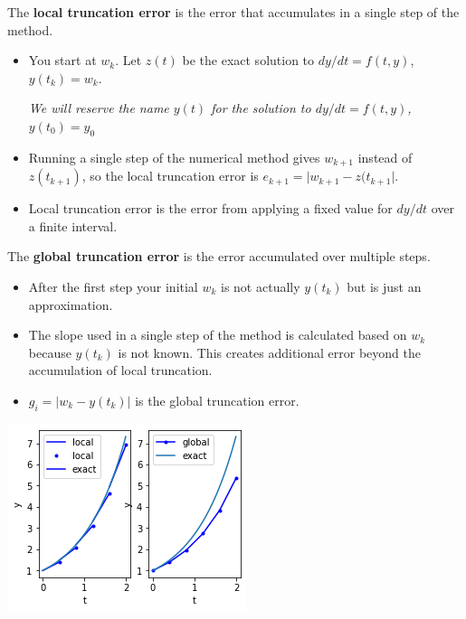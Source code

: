 \documentclass[12pt,letterpaper,noanswers]{exam}
\begin{document}
\begin{tcolorbox}
The \textbf{local truncation error} is the error that accumulates in a single step of the method.
\begin{itemize}
\itemsep0pt
    \item You start at $w_k$.  Let $z(t)$ be the exact solution to $dy/dt = f(t,y)$, $y(t_k) = w_k$.
    
    \emph{We will reserve the name $y(t)$ for the solution to $dy/dt = f(t,y)$, $y(t_0) = y_0$}
    \item Running a single step of the numerical method gives $w_{k+1}$ instead of $z(t_{k+1})$, so the local truncation error is $e_{k+1} = \vert w_{k+1} - z(t_{k+1}\vert$.
    \item Local truncation error is the error from applying a fixed value for $dy/dt$ over a finite interval.
\end{itemize}
The \textbf{global truncation error} is the error accumulated over multiple steps.
\begin{itemize}
\itemsep0pt
    \item After the first step your initial $w_k$ is not actually $y(t_k)$ but is just an approximation.
    \item The slope used in a single step of the method is calculated based on $w_k$ because $y(t_k)$ is not known.  This creates additional error beyond the accumulation of local truncation.
    \item $g_i = \vert w_k - y(t_k)\vert$ is the global truncation error.
\end{itemize}
\end{tcolorbox}
\includegraphics[]{img/C18Euler.png}
\end{document}
